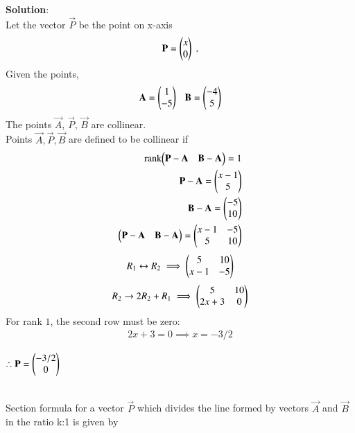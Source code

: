 \documentclass[journal]{IEEEtran}
\begin{document}
\textbf{Solution}:\\
Let the vector $\vec{P}$ be the point on x-axis
\begin{align}
    \vec{P}=\begin{myvec}{x\\0}\end{myvec} \;, 
\end{align}
Given the points,
\begin{align}
    \vec{A}=\begin{myvec}{1\\-5}\end{myvec}\ \ \ 
    \vec{B}=\begin{myvec}{-4\\5}\end{myvec}
\end{align}
\bigskip
The points $\vec{A}$, $\vec{P}$, $\vec{B}$ are collinear.\\
Points $\vec{A}, \vec{P}, \vec{B}$ are defined to be collinear if 
		\begin{align}
			\text{rank}{\ensuremath{\begin{pmatrix}\mathbf{P}-\mathbf{A}& \mathbf{B}-\mathbf{A}\end{pmatrix}}} = 1\\
            \mathbf{P}-\mathbf{A} = \begin{pmatrix}x-1\\5\end{pmatrix}\\
            \mathbf{B}-\mathbf{A} = \begin{pmatrix}-5\\10\end{pmatrix}\\
            \begin{pmatrix}\mathbf{P}-\mathbf{A}& \mathbf{B}-\mathbf{A}\end{pmatrix} = \begin{pmatrix}x-1 & -5\\5 & 10\end{pmatrix}
		\end{align}
\begin{align}
R_1 \leftrightarrow R_2 \implies \begin{pmatrix}5 & 10\\x-1 & -5\end{pmatrix}
\end{align}
\begin{align}
R_2 \rightarrow 2R_2 + R_1 \implies \begin{pmatrix}5 & 10\\2x+3 & 0\end{pmatrix}
\end{align}
For rank $1$, the second row must be zero:
\begin{align}
    2x+3=0 \implies x=-3/2
\end{align}
\begin{center}
$\therefore \vec{P}=\begin{myvec}{-3/2\\0}\end{myvec}$
\end{center}
\\
Section formula for a vector $\vec{P}$ which divides the line formed by vectors $\vec{A}$ and $\vec{B}$ in the ratio k:1 is given by
\end{document}
